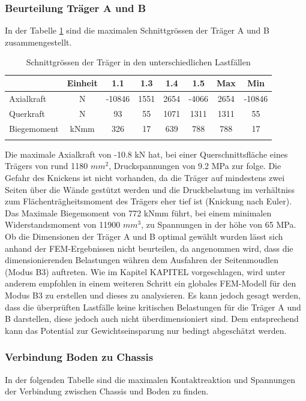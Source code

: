 \subsubsection{Beurteilung Träger A und B}
In der Tabelle \ref{tab:FEMres Träger} sind die maximalen Schnittgrössen der Träger A und B zusammengestellt.
\begin{table}[H]
\centering
\begin{tabular}{lccccccc}
\thickhline
	&	Einheit	&	1.1	&	1.3	&	1.4	&	1.5	&	Max	&	Min	\\	\hline
Axialkraft	&	N	&	-10846	&	1551	&	2654	&	-4066	&	2654	&	-10846	\\
Querkraft	&	N	&	93	&	55	&	1071	&	1311	&	1311	&	55	\\
Biegemoment	&	kNmm	&	326	&	17	&	639	&	788	&	788	&	17	\\	\thickhline
\end{tabular}
\caption{Schnittgrössen der Träger in den unterschiedlichen Lastfällen}
\label{tab:FEMres Träger}
\end{table}


Die maximale Axialkraft von -10.8 kN hat, bei einer Querschnittsfläche eines Trägers von rund 1180 $mm^2$, Druckspannungen von 9.2 MPa zur folge. Die Gefahr des Knickens ist nicht vorhanden, da die Träger auf mindestens zwei Seiten über die Wände gestützt werden und die Druckbelastung im verhältniss zum Flächenträgheitsmoment des Trägers eher tief ist (Knickung nach Euler). Das Maximale Biegemoment von 772 kNmm führt, bei einem minimalen Widerstandsmoment von 11900 $mm^3$, zu Spannungen in der höhe von 65 MPa.\\
Ob die Dimensionen der Träger A und B optimal gewählt wurden lässt sich anhand der FEM-Ergebnissen nicht beurteilen, da angenommen wird, dass die dimensionierenden Belastungen währen dem Ausfahren der Seitenmoudlen (Modus B3) auftreten. Wie im Kapitel KAPITEL vorgeschlagen, wird unter anderem empfohlen in einem weiteren Schritt ein globales FEM-Modell für den Modus B3 zu erstellen und dieses zu analysieren. Es kann jedoch gesagt werden, dass die überprüften Lastfälle keine kritischen Belastungen für die Träger A und B darstellen, diese jedoch auch nicht überdimensioniert sind. Dem entsprechend kann das Potential zur Gewichtseinsparung nur bedingt abgeschätzt werden.

\subsubsection{Verbindung Boden zu Chassis}
In der folgenden Tabelle sind die maximalen Kontaktreaktion und Spannungen der Verbindung zwischen Chassis und Boden zu finden.

